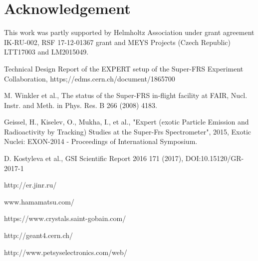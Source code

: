 \documentclass{webofc}
\begin{document}
\section{Acknowledgement}
This  work was partly supported by Helmholtz Association under grant agreement IK-RU-002, RSF 17-12-01367 grant and MEYS Projects (Czech Republic) LTT17003 and LM2015049.

	
\begin{thebibliography}{99}
	
	Technical Design Report of the EXPERT setup of the Super-FRS Experiment Collaboration, https;//edms.cern.ch/document/1865700
	
	M. Winkler et al., The status of the Super-FRS in-flight facility at FAIR, Nucl. Instr. and Meth. in Phys. Res. B 266 (2008) 4183.
	
	Geissel, H., Kiselev, O., Mukha, I., et al., "Expert (exotic Particle Emission and Radioactivity by Tracking) Studies at the Super-Frs Spectrometer", 2015, Exotic Nuclei: EXON-2014 - Proceedings of International Symposium.
	
	D. Kostyleva et al., GSI Scientific Report 2016 171 (2017), DOI:10.15120/GR-2017-1
	
	http://er.jinr.ru/
	
	www.hamamatsu.com/
	
	https://www.crystals.saint-gobain.com/
	
	http://geant4.cern.ch/
	
	http://www.petsyselectronics.com/web/
	
\end{thebibliography}
\end{document}
